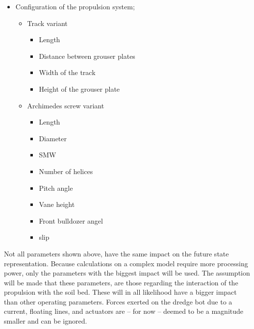 \begin{itemize}
\begin{itemize}
	\end{itemize}
	\item Configuration of the propulsion system;
	\begin{itemize}
		\setlength\itemsep{0mm}
		\item Track variant \cite{lotman_applicable_2009}
		\begin{itemize}
			\item Length\footnotemark[\getrefnumber{c}]
			\item Distance between grouser plates\footnotemark[\getrefnumber{c}]
			\item Width of the track\footnotemark[\getrefnumber{c}]
			\item Height of the grouser plate\footnotemark[\getrefnumber{c}]
		\end{itemize}
		\item Archimedes screw variant \cite{van_der_zee_prediction_2009}
		\begin{itemize}
			\setlength\itemsep{0mm}
			\item Length\footnotemark[\getrefnumber{c}]
			\item Diameter\footnotemark[\getrefnumber{c}]
			\item \acrfull{SMW}\footnotemark[\getrefnumber{c}]
			\item Number of helices\footnotemark[\getrefnumber{c}]
			\item Pitch angle\footnotemark[\getrefnumber{c}]
			\item Vane height\footnotemark[\getrefnumber{c}]
			\item Front bulldozer angel\footnotemark[\getrefnumber{c}]
			\item slip
		\end{itemize}
	\end{itemize}
\end{itemize}

Not all parameters shown above, have the same impact on the future state representation. Because calculations on a complex model require more processing power, only the parameters with the biggest impact will be used. The assumption will be made that these parameters, are those regarding the interaction of the propulsion with the soil bed. These will in all likelihood have a bigger impact than other operating parameters. Forces exerted on the dredge bot due to a current, floating lines, and actuators are -- for now -- deemed to be a magnitude smaller and can be ignored. 

